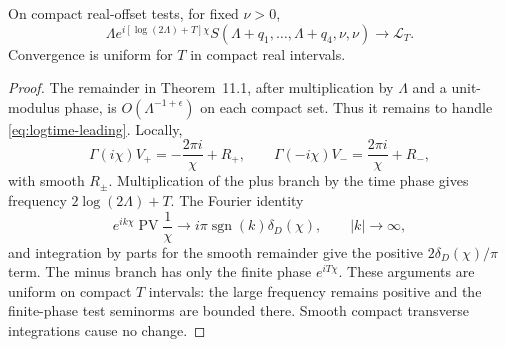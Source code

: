 \begin{theorem}
On compact real-offset tests, for fixed $\nu>0$,
\begin{equation}
 \Lambda e^{i[\log(2\Lambda)+T]\chi}
 S(\Lambda+q_1,\ldots,\Lambda+q_4,\nu,\nu)
 \longrightarrow\mathcal L_T.
 \label{eq:logtime-raw-limit}
\end{equation}
Convergence is uniform for $T$ in compact real intervals.
\label{thm:logtime-local}
\end{theorem}
\begin{proof}
The remainder in Theorem~11.1, after multiplication by $\Lambda$ and a
unit-modulus phase, is $O(\Lambda^{-1+\epsilon})$ on each compact set.
Thus it remains to handle \eqref{eq:logtime-leading}. Locally,
\[
 \Gamma(i\chi)V_+=-\frac{2\pi i}{\chi}+R_+,
 \qquad
 \Gamma(-i\chi)V_-=\frac{2\pi i}{\chi}+R_-,
\]
with smooth $R_\pm$. Multiplication of the plus branch by the time phase
gives frequency $2\log(2\Lambda)+T$. The Fourier identity
\[
 e^{ik\chi}\operatorname{PV}\frac1\chi
 \longrightarrow i\pi\operatorname{sgn}(k)\delta_D(\chi),
 \qquad |k|\to\infty,
\]
and integration by parts for the smooth remainder give the positive
$2\delta_D(\chi)/\pi$ term. The minus branch has only the finite phase
$e^{iT\chi}$. These arguments are uniform on compact $T$ intervals:
the large frequency remains positive and the finite-phase test seminorms
are bounded there. Smooth compact transverse integrations cause no change.
\end{proof}

